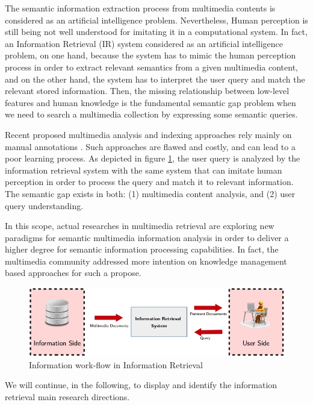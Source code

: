 	The semantic information extraction process from multimedia contents is considered as an artificial 
	intelligence problem. Nevertheless, Human perception is still being not well understood for imitating 
	it in a computational system. In fact, an Information Retrieval (IR) system  considered as an 
	artificial intelligence problem, on one hand, because the system has to mimic the human perception 
	process in order to extract relevant semantics from a given multimedia content, and on the other hand, 
	the system has to interpret the user query and match the relevant stored information. 
	Then, the missing relationship between low-level features and human knowledge is the fundamental semantic 
	gap problem when we need to search a multimedia collection by expressing some semantic queries. 
	
	Recent proposed multimedia analysis and indexing approaches rely mainly on manual annotations 
	\citep{Wang2011,Lazaridis2013,Jin2015}. Such approaches are flawed and costly, and can lead to 
	a poor learning process.  As depicted in figure \ref{state_fig1}, the user query is analyzed by the information 
	retrieval system with the same system that can imitate human perception in order to process the query 
	and match it to relevant information. The semantic gap exists in both: (1) multimedia content analysis, 
	and (2) user query understanding.

	In this scope, actual researches in multimedia retrieval are exploring new paradigms for semantic 
	multimedia information analysis in order to deliver a higher degree for semantic information 
	processing capabilities. In fact, the multimedia community addressed more intention on knowledge 
	management based approaches for such a propose. 

	\begin{figure}[ht!]
		\centering
		\includegraphics[scale=0.8]{figures/state_fig1}
		\caption{Information work-flow in Information Retrieval}
		\label{state_fig1}
	\end{figure}

	We will continue, in the following, 
	to display and identify the information retrieval main research directions. 

